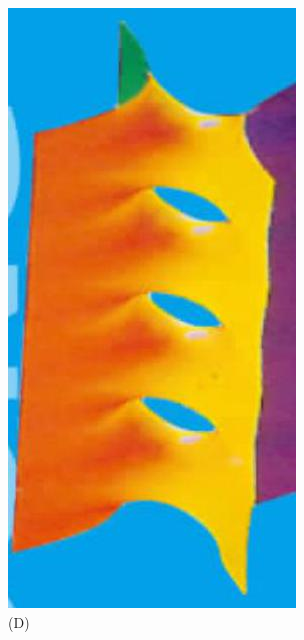 \documentclass[10pt]{article}
\begin{document}
\includegraphics[max width=\textwidth, center]{2024_10_30_66b8e5e701da2093c133g-001(1)}\\
(D)\\
\end{document}
